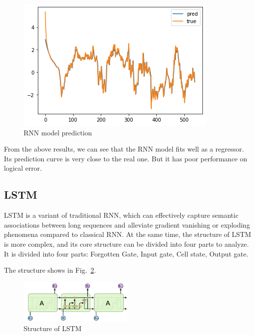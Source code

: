 \documentclass[runningheads]{llncs}
\begin{document}
\begin{figure}[htbp]
    \centering
    \includegraphics[width=\textwidth]{../img/rnn.png}
    \caption{RNN model prediction}
    \label{fig:15}
\end{figure}

From the above results, we can see that the RNN model fits well as a regressor. Its prediction curve is very close to the real one. But it has poor performance on logical error.

\subsection{LSTM}

LSTM is a variant of traditional RNN, which can effectively capture semantic associations between long sequences and alleviate gradient vanishing or exploding phenomena compared to classical RNN. At the same time, the structure of LSTM is more complex, and its core structure can be divided into four parts to analyze.  
It is divided into four parts: Forgotten Gate, Input gate, Cell state, Output gate. 

The structure shows in Fig.~\ref{fig:16}.


\begin{figure}[htbp]
    \centering
    \includegraphics[width=0.5\textwidth]{../img/dl/31.png}
    \caption{Structure of LSTM}
    \label{fig:16}
\end{figure}
\end{document}
